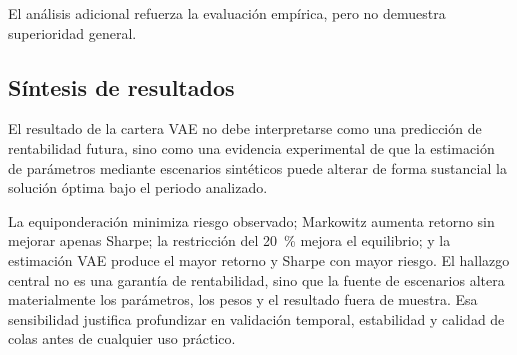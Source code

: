 El análisis adicional refuerza la evaluación empírica, pero no demuestra superioridad general.

\subsection{Síntesis de resultados}

El resultado de la cartera VAE no debe interpretarse como una predicción de rentabilidad futura, sino como una evidencia experimental de que la estimación de parámetros mediante escenarios sintéticos puede alterar de forma sustancial la solución óptima bajo el periodo analizado.

La equiponderación minimiza riesgo observado; Markowitz aumenta retorno sin mejorar apenas Sharpe; la restricción del 20~\% mejora el equilibrio; y la estimación VAE produce el mayor retorno y Sharpe con mayor riesgo. El hallazgo central no es una garantía de rentabilidad, sino que la fuente de escenarios altera materialmente los parámetros, los pesos y el resultado fuera de muestra. Esa sensibilidad justifica profundizar en validación temporal, estabilidad y calidad de colas antes de cualquier uso práctico.
